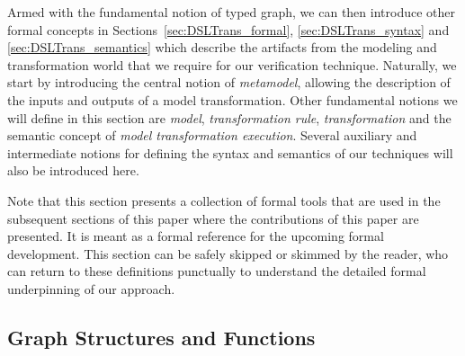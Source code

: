 

Armed with the fundamental notion of typed graph, we can then introduce other formal concepts in Sections~\ref{sec:DSLTrans_formal}, \ref{sec:DSLTrans_syntax} and \ref{sec:DSLTrans_semantics} which describe the artifacts from the modeling and transformation world that we require for our verification technique. Naturally, we start by introducing the central notion of \emph{metamodel}, allowing the description of the inputs and outputs of a model transformation. Other fundamental notions we will define in this section are \emph{model}, \emph{transformation rule}, \emph{transformation} and the semantic concept of \emph{model transformation execution}. Several auxiliary and intermediate notions for defining the syntax and semantics of our techniques will also be introduced here. 

Note that this section presents a collection of formal tools that are used in the subsequent sections of this paper where the contributions of this paper are presented. It is meant as a formal reference for the upcoming formal development. This section can be safely skipped or skimmed by the reader, who can return to these definitions punctually to understand the detailed formal underpinning of our approach. 



\newcommand{\defineggprime}{Let $\langle V,E,(s,t),\tau,VT,ET\rangle = g$, and\\ $\langle V',E',(s',t'),\tau',VT',ET'\rangle = g'$, where $g, g' \in \textsc{Tg}$.}

\newcommand{\ET}{\mathit{ET}}
\newcommand{\VT}{\mathit{VT}}


\subsection{Graph Structures and Functions}
\label{sec:typed_graphs}


